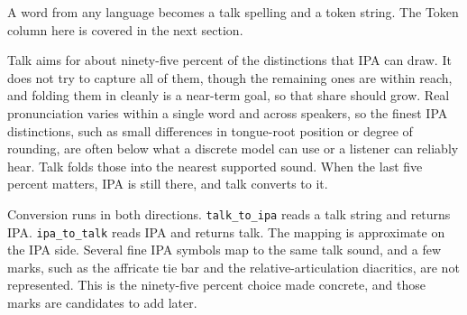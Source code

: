 A word from any language becomes a talk spelling and a token string. The
Token column here is covered in the next section.



Talk aims for about ninety-five percent of the distinctions that IPA can draw. It does not try to capture all of them, though the remaining ones are within reach, and folding them in cleanly is a near-term goal, so that share should grow. Real pronunciation varies within a single word and across speakers, so the finest IPA distinctions, such as small differences in tongue-root position or degree of rounding, are often below what a discrete model can use or a listener can reliably hear. Talk folds those into the nearest supported sound. When the last five percent matters, IPA is still there, and talk converts to it.

Conversion runs in both directions. \verb|talk_to_ipa| reads a talk string and returns IPA. \verb|ipa_to_talk| reads IPA and returns talk. The mapping is approximate on the IPA side. Several fine IPA symbols map to the same talk sound, and a few marks, such as the affricate tie bar and the relative-articulation diacritics, are not represented. This is the ninety-five percent choice made concrete, and those marks are candidates to add later.
